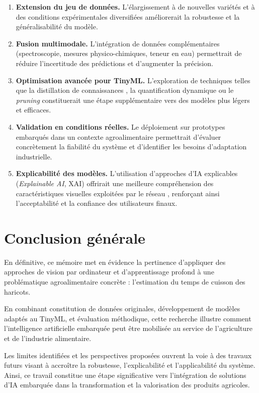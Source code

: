 \begin{enumerate}
    \item \textbf{Extension du jeu de données.} L’élargissement à de nouvelles variétés et à des conditions expérimentales diversifiées améliorerait la robustesse et la généralisabilité du modèle.
    
    \item \textbf{Fusion multimodale.} L’intégration de données complémentaires (spectroscopie, mesures physico-chimiques, teneur en eau) permettrait de réduire l’incertitude des prédictions et d’augmenter la précision.
    
    \item \textbf{Optimisation avancée pour TinyML.} L’exploration de techniques telles que la distillation de connaissances \cite{hinton2015distillation}, la quantification dynamique \cite{jacob2018quantization} ou le \textit{pruning} \cite{han2015deep} constituerait une étape supplémentaire vers des modèles plus légers et efficaces.
    
    \item \textbf{Validation en conditions réelles.} Le déploiement sur prototypes embarqués dans un contexte agroalimentaire permettrait d’évaluer concrètement la fiabilité du système et d’identifier les besoins d’adaptation industrielle.
    
    \item \textbf{Explicabilité des modèles.} L’utilisation d’approches d’IA explicables (\textit{Explainable AI}, XAI) offrirait une meilleure compréhension des caractéristiques visuelles exploitées par le réseau \cite{arrieta2020explainable}, renforçant ainsi l’acceptabilité et la confiance des utilisateurs finaux.
\end{enumerate}

\section{Conclusion générale}
\label{sec:conclusion_generale}

En définitive, ce mémoire met en évidence la pertinence d’appliquer des approches de vision par ordinateur et d’apprentissage profond à une problématique agroalimentaire concrète : l’estimation du temps de cuisson des haricots. 

En combinant constitution de données originales, développement de modèles adaptés au TinyML, et évaluation méthodique, cette recherche illustre comment l’intelligence artificielle embarquée peut être mobilisée au service de l’agriculture et de l’industrie alimentaire. 

Les limites identifiées et les perspectives proposées ouvrent la voie à des travaux futurs visant à accroître la robustesse, l’explicabilité et l’applicabilité du système. Ainsi, ce travail constitue une étape significative vers l’intégration de solutions d’IA embarquée dans la transformation et la valorisation des produits agricoles.
